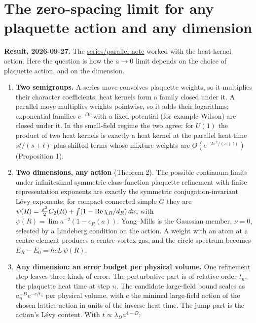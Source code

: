 \documentclass[11pt,a4paper]{article}
\newcommand{\tightlist}{\setlength{\itemsep}{0pt}\setlength{\parskip}{0pt}}
\begin{document}
\hypertarget{the-zero-spacing-limit-for-any-plaquette-action-and-any-dimension}{%
\section{The zero-spacing limit for any plaquette action and any
dimension}\label{the-zero-spacing-limit-for-any-plaquette-action-and-any-dimension}}

\textbf{Result, 2026-09-27.} The
\href{series-parallel-gauge-refinement.md}{series/parallel note} worked
with the heat-kernel action. Here the question is how the \(a\to0\)
limit depends on the choice of plaquette action, and on the dimension.

\begin{enumerate}
\def\labelenumi{\arabic{enumi}.}
\tightlist
\item
  \textbf{Two semigroups.} A series move convolves plaquette weights, so
  it multiplies their character coefficients; heat kernels form a family
  closed under it. A parallel move multiplies weights pointwise, so it
  adds their logarithms; exponential families \(e^{-\beta V}\) with a
  fixed potential (for example Wilson) are closed under it. In the
  small-field regime the two agree: for \(U(1)\) the product of two heat
  kernels is exactly a heat kernel at the parallel heat time
  \(st/(s+t)\) plus shifted terms whose mixture weights are
  \(O(e^{-2\pi^2/(s+t)})\) (Proposition 1).
\item
  \textbf{Two dimensions, any action} (Theorem 2). The possible
  continuum limits under infinitesimal symmetric class-function
  plaquette refinement with finite representation exponents are exactly
  the symmetric conjugation-invariant Lévy exponents; for compact
  connected simple \(G\) they are
  \(\psi(R)=\frac{\sigma^2}2C_2(R)+\int(1-{\rm Re}\,\chi_R/d_R)\,d\nu\),
  with \(\psi(R)=\lim a^{-2}(1-\hat c_R(a))\). Yang--Mills is the
  Gaussian member, \(\nu=0\), selected by a Lindeberg condition on the
  action. A weight with an atom at a centre element produces a
  centre-vortex gas, and the circle spectrum becomes
  \(E_R-E_0=\hbar cL\,\psi(R)\).
\item
  \textbf{Any dimension: an error budget per physical volume.} One
  refinement step leaves three kinds of error. The perturbative part is
  of relative order \(t_n\), the plaquette heat time at step \(n\). The
  candidate large-field bound scales as \(a_n^{-D}e^{-c/t_n}\) per
  physical volume, with \(c\) the minimal large-field action of the
  chosen lattice action in units of the inverse heat time. The jump part
  is the action's Lévy content. With \(t\propto\lambda_Da^{4-D}\):


\end{enumerate}
\end{document}
